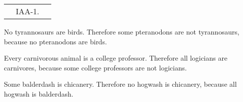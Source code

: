 \begin{exercises}
{\begin{longtabu}{X[3,l,p]X[2,l,p]X[1,l,p]}
&

IAA-1.
\end{longtabu}
}


\item No tyrannosaurs are birds. Therefore some pteranodons are not tyrannosaurs, because no pteranodons are birds.


\item Every carnivorous animal is a college professor. Therefore all logicians are carnivores, because some college professors are not logicians.


\item Some balderdash is chicanery. Therefore no hogwash is chicanery, because all hogwash is balderdash.



\end{exercises}
